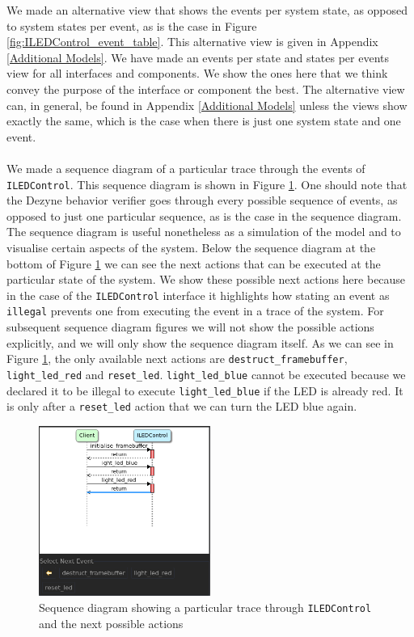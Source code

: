 \documentclass[12pt]{scrreprt}
\begin{document}
We made an alternative view that shows the events per system state, as opposed to system states per event, as is the case in Figure \ref{fig:ILEDControl_event_table}. This alternative view is given in Appendix \ref{Additional Models}. We have made an events per state and states per events view for all interfaces and components. We show the ones here that we think convey the purpose of the interface or component the best. The alternative view can, in general, be found in Appendix \ref{Additional Models} unless the views show exactly the same, which is the case when there is just one system state and one event.
\\\\
We made a sequence diagram of a particular trace through the events of \texttt{ILEDControl}. This sequence diagram is shown in Figure \ref{fig:ILEDControl_seq}. One should note that the Dezyne behavior verifier goes through every possible sequence of events, as opposed to just one particular sequence, as is the case in the sequence diagram. The sequence diagram is useful nonetheless as a simulation of the model and to visualise certain aspects of the system. Below the sequence diagram at the bottom of Figure \ref{fig:ILEDControl_seq} we can see the next actions that can be executed at the particular state of the system. We show these possible next actions here because in the case of the \texttt{ILEDControl} interface it highlights how stating an event as \texttt{illegal} prevents one from executing the event in a trace of the system. For subsequent sequence diagram figures we will not show the possible actions explicitly, and we will only show the sequence diagram itself. As we can see in Figure \ref{fig:ILEDControl_seq}, the only available next actions are \texttt{destruct\_framebuffer}, \texttt{light\_led\_red} and \texttt{reset\_led}. \texttt{light\_led\_blue} cannot be executed because we declared it to be illegal to execute \texttt{light\_led\_blue} if the LED is already red. It is only after a \texttt{reset\_led} action that we can turn the LED blue again.

\begin{figure}[H]
    \centering
    \includegraphics[width=0.5\textwidth]{Figures/results/modelling_figures/ILEDControl/ILEDControl_seq_enhanced.png}
    \caption{Sequence diagram showing a particular trace through \texttt{ILEDControl} and the next possible actions}
    \label{fig:ILEDControl_seq}
\end{figure}
\end{document}
